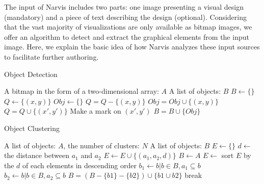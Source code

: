The input of Narvis includes two parts: one image presenting a visual design (mandatory) and a piece of text describing the design (optional). Considering that the vast majority of visualizations are only available as bitmap images, we offer an algorithm to detect and extract the graphical elements from the input image. Here, we explain the basic idea of how Narvis analyzes these input sources to facilitate further authoring. 
\begin{algorithm} 
        \caption{Object Detection}  
        \label{alg:alg1}
        \begin{algorithmic} %
            \Require A bitmap in the form of a two-dimensional array: $A$
            \Ensure A list of objects: $B$
            \State $B \gets \{\}$
                    \State $Q \gets \{(x,y)\} $
                    \State $Obj \gets \{\}$
                        \State $Q = Q - \{(x,y)\}$
                        \State $Obj = Obj \cup \{(x,y)\}$
                                \State $Q = Q \cup \{(x',y')\}$
                                \State Make a mark on $(x',y')$
                            \EndIf
                        \EndFor
                    \EndFor
                    \State $B = B \cup \{Obj\}$
                \EndIf
            \EndFor
            \State {}
        \end{algorithmic}  
    \end{algorithm} 
    
    
    \begin{algorithm}  
        \caption{Object Clustering} 
        \label{alg:alg2} 
        \begin{algorithmic} %
            \Require A list of objects: $A$, the number of clusters: $N$
            \Ensure A list of objects: $B$
            \State $E \gets \{\}$
                 
                        \State $d \gets$ the distance between $a_1$ and $a_2$
                        \State $E \gets E \cup \{(a_1, a_2, d)\}$
                    \EndIf
                \EndFor
            \EndFor
            \State $B \gets A$
            \State $E \gets$ sort $E$ by the $d$ of each elements in descending order
                \State $b_1 \gets b|b\in B, a_1 \subseteq b$
                \State $b_2 \gets b|b\in B, a_2 \subseteq b$
                    \State $B = (B - \{b1\} - \{b2\})\cup \{b1 \cup b2\}$
                \EndIf
                    \State break
                \EndIf
            \EndFor
            \State {}
        \end{algorithmic}  
    \end{algorithm} 
    
